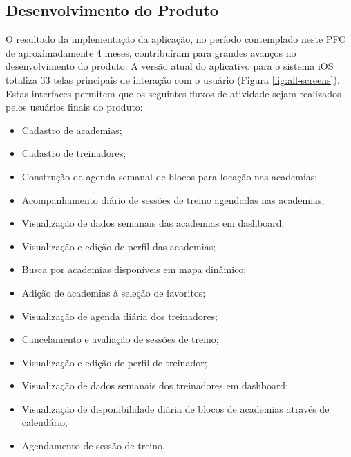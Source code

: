 \subsection{Desenvolvimento do Produto}
O resultado da implementação da aplicação, no período contemplado neste PFC de aproximadamente 4 meses, contribuíram para grandes avanços no desenvolvimento do produto. A versão atual do aplicativo para o sistema iOS totaliza 33 telas principais de interação com o usuário (Figura \ref{fig:all-screens}). Estas interfaces permitem que os seguintes fluxos de atividade sejam realizados pelos usuários finais do produto:
\begin{itemize}
    \item Cadastro de academias;
    \item Cadastro de treinadores;
    \item Construção de agenda semanal de blocos para locação nas academias;
    \item Acompanhamento diário de sessões de treino agendadas nas academias;
    \item Visualização de dados semanais das academias em dashboard;
    \item Visualização e edição de perfil das academias;
    \item Busca por academias disponíveis em mapa dinâmico;
    \item Adição de academias à seleção de favoritos;
    \item Visualização de agenda diária dos treinadores;
    \item Cancelamento e avaliação de sessões de treino;
    \item Visualização e edição de perfil de treinador;
    \item Visualização de dados semanais dos treinadores em dashboard;
    \item Visualização de disponibilidade diária de blocos de academias através de calendário;
    \item Agendamento de sessão de treino.
\end{itemize}
